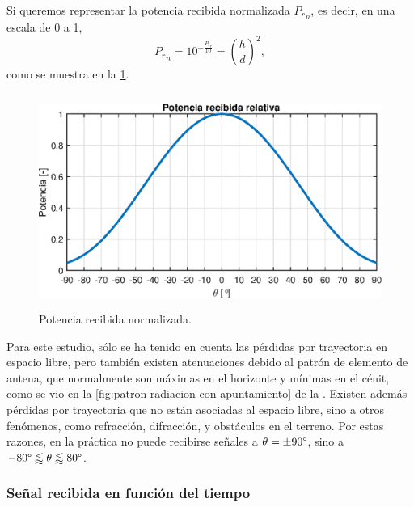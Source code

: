 \documentclass{article}
\newenvironment{standalone}{\begin{preview}}{\end{preview}}
\begin{document}
\begin{standalone}
  Si queremos representar la potencia recibida normalizada ${P_r}_n$, es decir, en una escala de 0 a 1,
  \begin{equation}
    {P_r}_n = 10^{ - \frac{{P_l}_r}{10} } = \left( \frac{h}{d} \right)^2,
  \end{equation}
  como se muestra en la \cref{fig:received-power}.

  \begin{figure}[!htbp]
    \centering
    \includegraphics[width=\linewidth, height=70mm, keepaspectratio]{../images/received-power.eps}
    \caption{Potencia recibida normalizada.}
    \label{fig:received-power}
  \end{figure}

  Para este estudio, sólo se ha tenido en cuenta las pérdidas por trayectoria en espacio libre, pero también existen atenuaciones debido al patrón de elemento de antena, que normalmente son máximas en el horizonte y mínimas en el cénit, como se vio en la \cref{fig:patron-radiacion-con-apuntamiento} de la .
  Existen además pérdidas por trayectoria que no están asociadas al espacio libre, sino a otros fenómenos, como refracción, difracción, y obstáculos en el terreno.
  Por estas razones, en la práctica no puede recibirse señales a $\theta = \pm 90 \degree$, sino a $-80\degree \lessapprox \theta \lessapprox 80\degree$.


  \subsubsection{Señal recibida en función del tiempo}


\end{standalone}
\end{document}
